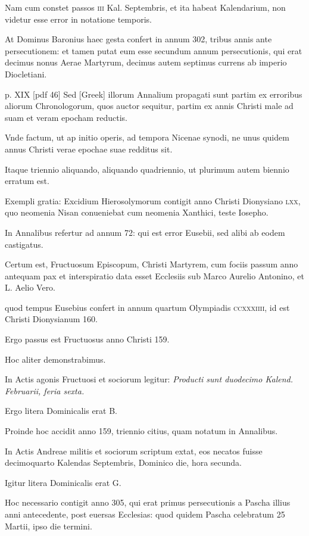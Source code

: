 \begin{parnumbers}
Nam cum constet passos \textsc{iii} Kal. Septembris, et ita habeat
Kalendarium, non videtur esse error in notatione temporis.

At Dominus Baronius haec gesta confert in annum 302, tribus annis ante
persecutionem: et tamen putat eum esse secundum annum persecutionis,
qui erat decimus nonus Aerae Martyrum, decimus autem
septimus currens ab imperio Diocletiani.

\clearpage
p. XIX [pdf 46]
Sed \textgreek{[Greek]} illorum
Annalium propagati sunt partim ex erroribus aliorum Chronologorum,
quos auctor sequitur, partim ex annis Christi male ad
suam et veram epocham reductis.

Vnde factum, ut ap initio operis,
ad tempora Nicenae synodi, ne unus quidem annus Christi
verae epochae suae redditus sit.

Itaque triennio aliquando, aliquando
quadriennio, ut plurimum autem biennio erratum est.

Exempli
gratia: Excidium Hierosolymorum contigit anno Christi
Dionysiano \textsc{lxx}, quo neomenia Nisan conueniebat cum neomenia
Xanthici, teste Iosepho.

In Annalibus refertur ad annum
72: qui est error Eusebii, sed alibi ab eodem castigatus.

Certum est, Fructuosum Episcopum, Christi Martyrem, cum fociis
passum anno antequam pax et interspiratio data esset Ecclesiis
sub Marco Aurelio Antonino, et L. Aelio Vero.

quod tempus Eusebius confert in annum quartum Olympiadis \textsc{ccxxxiiii},
id est Christi Dionysianum 160.

Ergo passus est Fructuosus anno Christi
159.

Hoc aliter demonstrabimus.

In Actis agonis Fructuosi et
sociorum legitur: \textit{Producti sunt duodecimo Kalend. Februarii, feria
sexta.}

Ergo litera Dominicalis erat B.

Proinde hoc accidit anno
159, triennio citius, quam notatum in Annalibus.

In Actis Andreae
militis et sociorum scriptum extat, eos necatos fuisse decimoquarto
Kalendas Septembris, Dominico die, hora secunda.

Igitur litera Dominicalis erat G.

Hoc necessario contigit anno 305,
qui erat primus persecutionis a Pascha illius anni antecedente, post
euersas Ecclesias: quod quidem Pascha celebratum 25 Martii, ipso
die termini.


\end{parnumbers}
